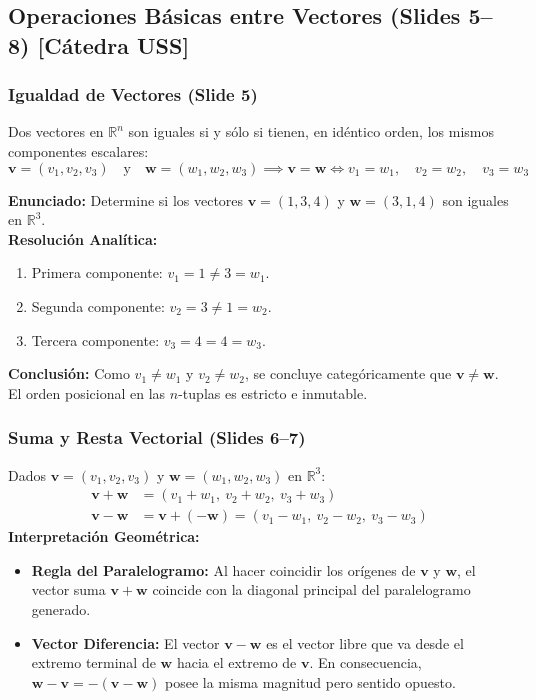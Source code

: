 \documentclass[10pt,letterpaper]{article}
\newcommand{\vv}{\mathbf{v}}
\newcommand{\vw}{\mathbf{w}}
\begin{document}
\subsection{Operaciones Básicas entre Vectores (Slides 5--8) [Cátedra USS]}

\subsubsection{Igualdad de Vectores (Slide 5)}
Dos vectores en $\mathbb{R}^n$ son iguales si y sólo si tienen, en idéntico orden, los mismos componentes escalares:
\[
\vv = (v_1, v_2, v_3) \quad \text{y} \quad \vw = (w_1, w_2, w_3) \implies \vv = \vw \iff v_1 = w_1, \quad v_2 = w_2, \quad v_3 = w_3
\]

\begin{cajaEjemplo}
\textbf{Enunciado:} Determine si los vectores $\vv = (1, 3, 4)$ y $\vw = (3, 1, 4)$ son iguales en $\mathbb{R}^3$.\\[0.15cm]
\textbf{Resolución Analítica:}
\begin{enumerate}
    \item Primera componente: $v_1 = 1 \neq 3 = w_1$.
    \item Segunda componente: $v_2 = 3 \neq 1 = w_2$.
    \item Tercera componente: $v_3 = 4 = 4 = w_3$.
\end{enumerate}
\textbf{Conclusión:} Como $v_1 \neq w_1$ y $v_2 \neq w_2$, se concluye categóricamente que $\vv \neq \vw$. El orden posicional en las $n$-tuplas es estricto e inmutable.
\end{cajaEjemplo}

\subsubsection{Suma y Resta Vectorial (Slides 6--7)}
Dados $\vv = (v_1, v_2, v_3)$ y $\vw = (w_1, w_2, w_3)$ en $\mathbb{R}^3$:
\begin{align*}
\vv + \vw &= (v_1 + w_1,\ v_2 + w_2,\ v_3 + w_3) \\
\vv - \vw &= \vv + (-\vw) = (v_1 - w_1,\ v_2 - w_2,\ v_3 - w_3)
\end{align*}
\textbf{Interpretación Geométrica:}
\begin{itemize}
    \item \textbf{Regla del Paralelogramo:} Al hacer coincidir los orígenes de $\vv$ y $\vw$, el vector suma $\vv + \vw$ coincide con la diagonal principal del paralelogramo generado.
    \item \textbf{Vector Diferencia:} El vector $\vv - \vw$ es el vector libre que va desde el extremo terminal de $\vw$ hacia el extremo de $\vv$. En consecuencia, $\vw - \vv = -(\vv - \vw)$ posee la misma magnitud pero sentido opuesto.
\end{itemize}
\end{document}
